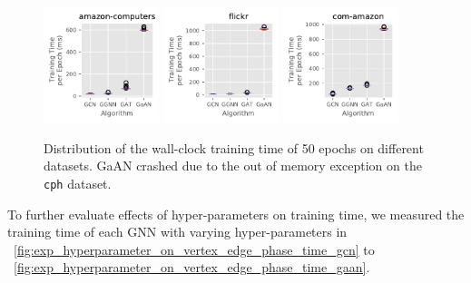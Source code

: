 \begin{figure}[H]
    \includegraphics[width=0.3\textwidth]{figs/experiments/exp_absolute_training_time_comparison_amazon-computers.pdf}
    \includegraphics[width=0.3\textwidth]{figs/experiments/exp_absolute_training_time_comparison_flickr.pdf}
    \includegraphics[width=0.3\textwidth]{figs/experiments/exp_absolute_training_time_comparison_com-amazon.pdf}
    \caption{Distribution of the wall-clock training time of 50 epochs on different datasets. GaAN crashed due to the out of memory exception on the \texttt{cph} dataset.}
    \label{fig:exp_absolute_training_time}
\end{figure}

To further evaluate effects of hyper-parameters on training time, we measured the training time of each GNN with varying hyper-parameters in \figurename~\ref{fig:exp_hyperparameter_on_vertex_edge_phase_time_gcn} to \figurename~\ref{fig:exp_hyperparameter_on_vertex_edge_phase_time_gaan}.



